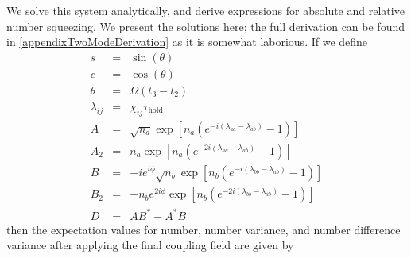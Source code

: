 \documentclass{iopart}
\begin{document}
We solve this system analytically, and derive expressions for absolute and relative number squeezing. We present the solutions here; the full derivation can be found in \ref{appendixTwoModeDerivation} as it is somewhat laborious. If we define
\begin{eqnarray}
s &=& \sin(\theta) \label{eqsDef} \\
c &=& \cos(\theta) \\
\theta &=& \Omega(t_3 - t_2) \\
\lambda_{ij} &=& \chi_{ij} \tau_{\mathrm{hold}} \\
A &=& \sqrt{n_a} \exp [n_a (e^{-i(\lambda_{aa}-\lambda_{ab})} - 1 )] \\
A_2 &=& n_a \exp [n_a (e^{-2i(\lambda_{aa}-\lambda_{ab})} - 1 )] \\
B &=& -i e^{i \phi}\sqrt{n_b} \exp [n_b (e^{-i(\lambda_{bb}-\lambda_{ab})} - 1 )] \\
B_2 &=& -n_b e^{2i\phi} \exp [n_b (e^{-2i(\lambda_{bb}-\lambda_{ab})} - 1 )] \\
D &=& AB^* - A^*B \label{eqDDef}
\end{eqnarray}
then the expectation values for number, number variance, and number difference variance after applying the final coupling field are given by
\end{document}
